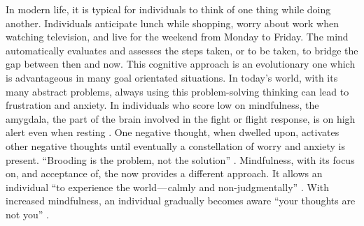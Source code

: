 In modern life, it is typical for individuals to think of one thing while doing another. Individuals anticipate lunch while shopping, worry about work when watching television, and live for the weekend from Monday to Friday. The mind automatically evaluates and assesses the steps taken, or to be taken, to bridge the gap between then and now. This cognitive approach is an evolutionary one which is advantageous in many goal orientated situations. In today’s world, with its many abstract problems, always using this problem-solving thinking can lead to frustration and anxiety. In individuals who score low on mindfulness, the amygdala, the part of the brain involved in the fight or flight response, is on high alert even when resting \citep{way_dispositional_2010}. 
One negative thought, when dwelled upon, activates other negative thoughts until eventually a constellation of worry and anxiety is present. “Brooding is the problem, not the solution” \citep[][p30]{williams_mindfulness:_2011}. Mindfulness, with its focus on, and acceptance of, the now provides a different approach. It allows an individual “to experience the world — calmly and non-judgmentally” \citep[][p45]{williams_mindfulness:_2011}. With increased mindfulness, an individual gradually becomes aware “your thoughts are not you” \citep[][p64]{williams_mindfulness:_2011}.
  
  
